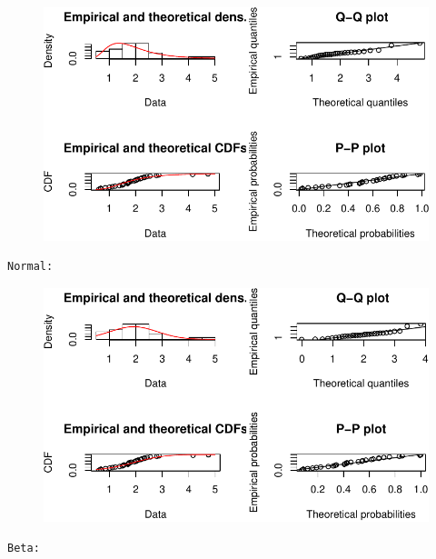 \documentclass[
  letterpaper,
  DIV=11,
  numbers=noendperiod]{scrartcl}
\begin{document}
\begin{figure}[H]

{\centering \includegraphics{quiz5_files/figure-pdf/unnamed-chunk-33-4.pdf}

}

\end{figure}

\begin{verbatim}
Normal: 
\end{verbatim}

\begin{figure}[H]

{\centering \includegraphics{quiz5_files/figure-pdf/unnamed-chunk-33-5.pdf}

}

\end{figure}

\begin{verbatim}
Beta: 
\end{verbatim}
\end{document}
